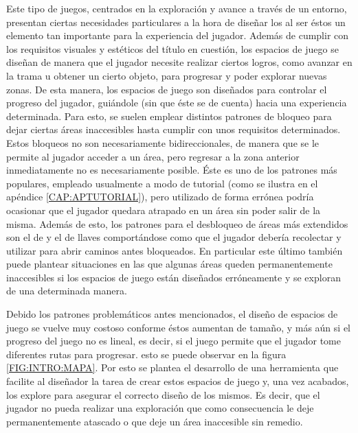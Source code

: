 Este tipo de juegos, centrados en la exploración y avance a través de un entorno, presentan ciertas necesidades particulares a la hora de diseñar los  al ser éstos un elemento tan importante para la experiencia del jugador.
Además de cumplir con los requisitos visuales y estéticos del título en cuestión, los espacios de juego se diseñan de manera que el jugador necesite realizar ciertos logros, como avanzar en la trama u obtener un cierto objeto, para progresar y poder explorar nuevas zonas. De esta manera, los espacios de juego son diseñados para controlar el progreso del jugador, guiándole (sin que éste se de cuenta) hacia una experiencia determinada.\newline
Para esto, se suelen emplear distintos patrones de bloqueo para dejar ciertas áreas inaccesibles hasta cumplir con unos requisitos determinados.\newline
Estos bloqueos no son necesariamente bidireccionales, de manera que se le permite al jugador acceder a un área, pero regresar a la zona anterior inmediatamente no es necesariamente posible. Éste es uno de los patrones más populares, empleado usualmente a modo de tutorial (como se ilustra en el apéndice \ref{CAP:APTUTORIAL}), pero utilizado de forma errónea podría ocasionar que el jugador quedara atrapado en un área sin poder salir de la misma.\newline
Además de esto, los patrones para el desbloqueo de áreas más extendidos son el de  y el de llaves comportándose como  que el jugador debería recolectar y utilizar para abrir caminos antes bloqueados. En particular este último también puede plantear situaciones en las que algunas áreas queden permanentemente inaccesibles si los espacios de juego están diseñados erróneamente y se exploran de una determinada manera.\newline

Debido los patrones problemáticos antes mencionados, el diseño de espacios de juego se vuelve muy costoso conforme éstos aumentan de tamaño, y más aún si el progreso del juego no es lineal, es decir, si el juego permite que el jugador tome diferentes rutas para progresar. esto se puede observar en la figura \ref{FIG:INTRO:MAPA}. Por esto se plantea el desarrollo de una herramienta que facilite al diseñador la tarea de crear estos espacios de juego y, una vez acabados, los explore para asegurar el correcto diseño de los mismos. Es decir, que el jugador no pueda realizar una exploración que como consecuencia le deje permanentemente atascado o que deje un área inaccesible sin remedio.


